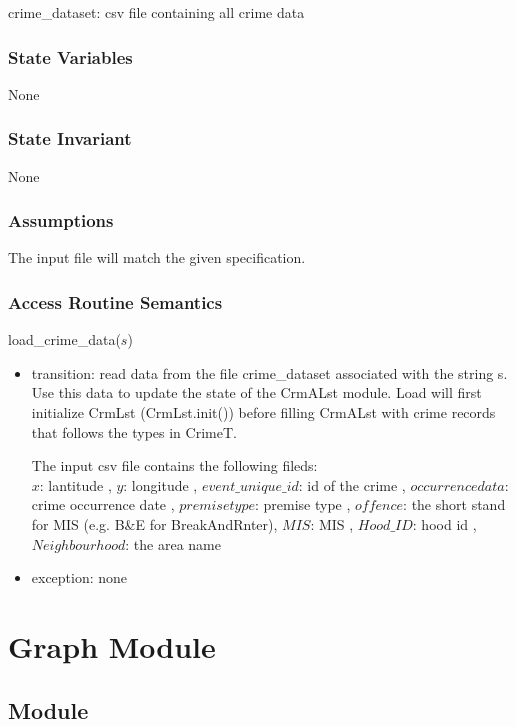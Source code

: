 \documentclass[12pt]{article}
\begin{document}
crime\_dataset: csv file containing all crime data

\subsubsection* {State Variables}

None

\subsubsection* {State Invariant}

None

\subsubsection* {Assumptions}

The input file will match the given specification.

\subsubsection* {Access Routine Semantics}

\noindent load\_crime\_data($s$)
\begin{itemize}
\item transition: read data from the file crime\_dataset associated with the string s.
  Use this data to update the state of the CrmALst module.  Load will first
  initialize CrmLst (CrmLst.init()) before filling CrmALst with crime records that
  follows the types in CrimeT.

  The input csv file contains the following fileds:\\
  $x$: lantitude ,  $y$: longitude ,  $event\_unique\_id$: id of the crime , $occurrencedata$: crime occurrence date , 
  $premisetype$: premise type , $offence$: the short stand for MIS (e.g. B\&E for BreakAndRnter), 
  $MIS$: MIS , $Hood\_ID$: hood id , $Neighbourhood$: the area name\\
  
 
\item exception: none
\end{itemize}


\newpage
\section* {Graph Module}

\subsection*{Module}
\end{document}
